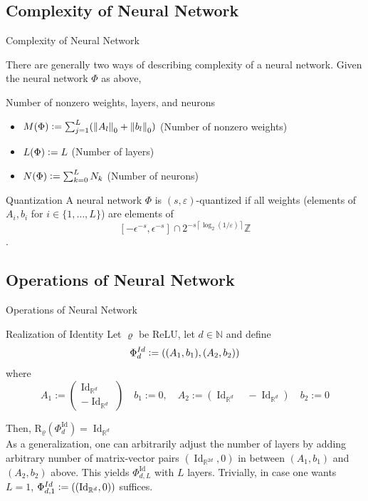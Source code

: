 \documentclass{if-beamer}
\newcommand{\defeq}{\vcentcolon=}
\newcommand{\norm}[2]{\left\lVert#1\right\rVert_{#2}}
\begin{document}
\subsection{Complexity of Neural Network}

\begin{frame}{Complexity of Neural Network}

\vskip 0.5cm
There are generally two ways of describing complexity of a neural network. Given the neural network $\Phi$ as above,
\begin{block}{Number of nonzero weights, layers, and neurons}
\begin{itemize}
    \item $M(\Phi) \defeq \sum_{j=1}^L (\norm{A_l}{0} + \norm{b_l}{0})$ (Number of nonzero weights)
    \item $L(\Phi) \defeq L$ (Number of layers)
    \item $N(\Phi) \defeq \sum_{k=0}^L N_k$ (Number of neurons)
\end{itemize}

\end{block}

\begin{block}{Quantization}
A neural network $\Phi$ is $(s,\varepsilon)$-quantized if all weights (elements of $A_i, b_i$ for $i\in\{1,\dots,L\}$) are elements of $$[-\epsilon^{-s}, \epsilon^{-s}] \cap 2^{-s\left\lceil\log _{2}(1 / \varepsilon)\right\rceil} \mathbb{Z}$$.
\end{block}
\end{frame}

\subsection{Operations of Neural Network}
\begin{frame}{Operations of Neural Network}
    \begin{block}{Realization of Identity}
        Let $\varrho$ be ReLU, let $d \in \mathbb{N}$ and define $$\Phi_d^{Id} \defeq \left((A_1,b_1),(A_2,b_2) \right) $$
        where 
        $$A_{1}:=\left(
        \begin{array}{c}
            \operatorname{Id}_{\mathbb{R}^{d}} \\
            -\operatorname{Id}_{\mathbb{R}^{d}}
        \end{array}
        \right) \quad b_{1}:=0, 
        \quad A_{2}:=\left(\operatorname{Id}_{\mathbb{R}^{d}} \quad-\operatorname{Id}_{\mathbb{R}^{d}}\right) \quad b_{2}:=0
        $$
    \end{block}
    Then, $\mathrm{R}_{\varrho}(\Phi_{d}^{\operatorname{Id}}) = \operatorname{Id}_{\mathbb{R}^d}$\\
    \medskip
    As a generalization, one can arbitrarily adjust the number of layers by adding arbitrary number of matrix-vector pairs $(\operatorname{Id}_{\mathbb{R}^{2d}}, 0)$ in between $(A_1,b_1)$ and $(A_2,b_2)$ above. This yields $\Phi_{d,L}^{\operatorname{Id}}$ with $L$ layers. Trivially, in case one wants $L=1$, $\Phi_{d,1}^{Id} \defeq \left((\operatorname{Id}_{\mathbb{R}^d}, 0) \right)$ suffices.
\end{frame}
\end{document}
